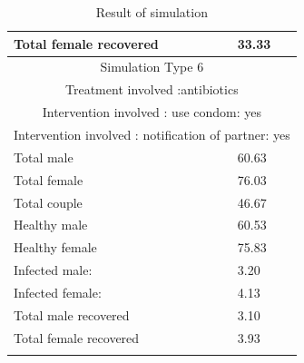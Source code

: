 \documentclass{article}
\begin{document}
\begin{normalsize}
\begin{longtable}{|p{7cm}|p{7cm}|}
		Total female recovered & 33.33\\		
		\hline
		\multicolumn{2}{|c|}{Simulation Type $6$} \\
		\multicolumn{2}{|c|}{Treatment involved :antibiotics} \\
		\multicolumn{2}{|c|}{Intervention involved : use condom: yes} \\
		\multicolumn{2}{|c|}{Intervention involved : notification of partner: yes} \\
		\hline
		Total male & 60.63\\
		Total female & 76.03\\
		Total couple & 46.67\\
		Healthy male & 60.53\\
		Healthy female & 75.83\\
		Infected male: & 3.20\\
		Infected female: & 4.13\\
		Total male recovered & 3.10\\
		Total female recovered & 3.93\\
		\hline
	\caption{Result of simulation}
	\label{tab:result}
\end{longtable}


\end{normalsize}
\end{document}
